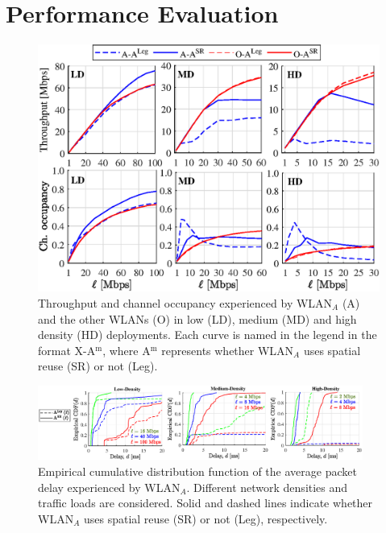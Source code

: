 \documentclass[conference]{IEEEtran}
\begin{document}
	\section{Performance Evaluation}
	\label{section:perfromance_evaluation}
	
	\begin{figure}[ht!]
		\centering
		\includegraphics[width=\columnwidth]{throughput_occupancy}
		\caption{Throughput and channel occupancy experienced by WLAN$_A$ (A) and the other WLANs (O) in low (LD), medium (MD) and high density (HD) deployments. Each curve is named in the legend in the format X-A$^{\text{m}}$, where A$^{\text{m}}$ represents whether WLAN$_A$ uses spatial reuse (SR) or not (Leg).}
		\label{fig:throughput_occupancy}
	\end{figure}
	
	\begin{figure}[ht!]
		\centering
		\includegraphics[width=0.95\textwidth]{cdf_delay}
		\caption{Empirical cumulative distribution function of the average packet delay experienced by WLAN$_A$. Different network densities and traffic loads are considered. Solid and dashed lines indicate whether WLAN$_A$ uses spatial reuse (SR) or not (Leg), respectively.}
		\label{fig:cdf_delay}
	\end{figure}
	
\end{document}
